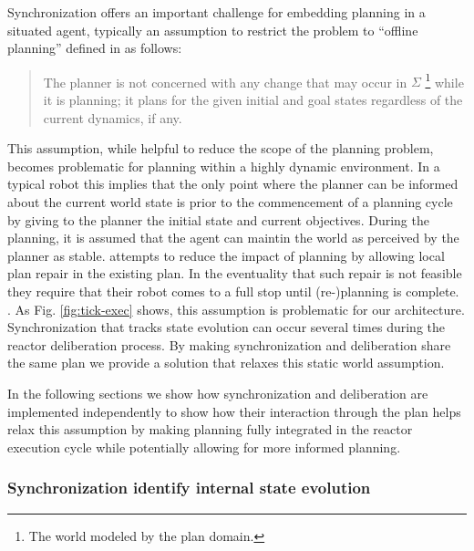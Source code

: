 Synchronization offers an important challenge for embedding planning
in a situated agent, typically %
an assumption to restrict the problem to ``offline planning'' defined
in \cite{ghallab04} as follows:

\begin{quotation}
  The planner is not concerned with any change that may occur in
  $\Sigma$ \footnote{The world modeled by the plan domain.} while it is
  planning; it plans for the given initial and goal states regardless
  of the current dynamics, if any. 
\end{quotation}

This assumption, while helpful to reduce the scope of the planning
problem, becomes problematic for planning within a highly dynamic
environment. In a typical robot this implies that the only point where
the planner can be informed about the current world state is prior to
the commencement of a planning cycle by giving to the planner the
initial state and current objectives. During the planning, it is
assumed that the agent can maintin the world as perceived by the
planner as stable. \cite{lemai04, lemai-chenevier2004} attempts to
reduce the impact of planning by allowing local plan repair in the
existing plan. In the eventuality that such repair is not feasible
they require that their robot comes to a full stop until (re-)planning
is complete. . As Fig.
\ref{fig:tick-exec} shows, this assumption is problematic for our
architecture. Synchronization that tracks state evolution can occur
several times during the reactor deliberation process. By making
synchronization and deliberation share the same plan we provide a
solution that relaxes this static world assumption. 

In the following sections we show how synchronization and deliberation
are implemented independently to show how their interaction through
the plan helps relax this assumption by making planning fully
integrated in the reactor execution cycle while potentially allowing
for more informed planning.

\subsubsection{Synchronization identify internal state evolution}
\label{sec:arch:synch}

